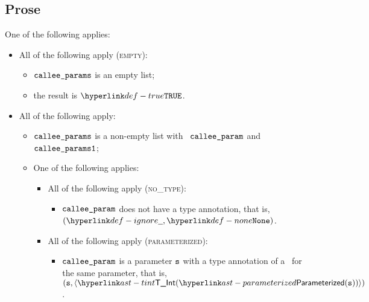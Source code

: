 \subsection{Prose}
One of the following applies:
\begin{itemize}
  \item All of the following apply (\textsc{empty}):
  \begin{itemize}
    \item $\texttt{callee\_params}$ is an empty list;
    \item the result is $\True$.
  \end{itemize}

  \item All of the following apply:
  \begin{itemize}
    \item $\texttt{callee\_params}$ is a non-empty list with \head\ $\texttt{callee\_param}$ and \tail\ \\
          $\texttt{callee\_params1}$;
    \item One of the following applies:
    \begin{itemize}
      \item All of the following apply (\textsc{no\_type}):
      \begin{itemize}
        \item $\texttt{callee\_param}$ does not have a type annotation, that is, $(\Ignore, \None)$.
      \end{itemize}

      \item All of the following apply (\textsc{parameterized}):
      \begin{itemize}
        \item $\texttt{callee\_param}$ is a parameter $\texttt{s}$ with a type annotation of a
              \parameterizedintegertype\ for the same parameter, that is, \\
              $(\vs, \langle\TInt(\parameterized(\vs))\rangle)$.
      \end{itemize}


\end{itemize}
\end{itemize}
\end{itemize}
